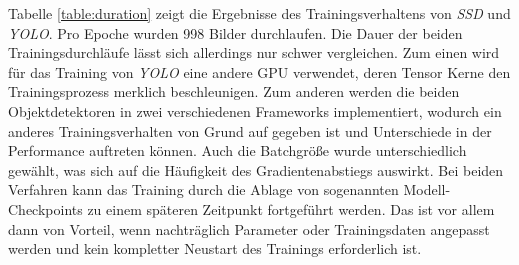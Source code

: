 Tabelle \ref{table:duration} zeigt die Ergebnisse des Trainingsverhaltens von \textit{SSD} und \textit{YOLO}. Pro Epoche wurden 998 Bilder durchlaufen. Die Dauer der beiden Trainingsdurchläufe lässt sich allerdings nur schwer vergleichen. Zum einen wird für das Training von \textit{YOLO} eine andere GPU verwendet, deren Tensor Kerne den Trainingsprozess merklich beschleunigen. Zum anderen werden die beiden Objektdetektoren in zwei verschiedenen Frameworks implementiert, wodurch ein anderes Trainingsverhalten von Grund auf gegeben ist und Unterschiede in der Performance auftreten können. Auch die Batchgröße wurde unterschiedlich gewählt, was sich auf die Häufigkeit des Gradientenabstiegs auswirkt. Bei beiden Verfahren kann das Training durch die Ablage von sogenannten Modell-Checkpoints zu einem späteren Zeitpunkt fortgeführt werden. Das ist vor allem dann von Vorteil, wenn nachträglich Parameter oder Trainingsdaten angepasst werden und kein kompletter Neustart des Trainings erforderlich ist.

